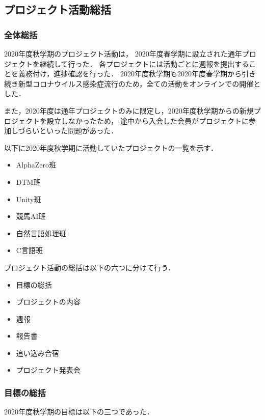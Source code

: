 \subsection*{プロジェクト活動総括}


\subsubsection*{全体総括}
2020年度秋学期のプロジェクト活動は，
2020年度春学期に設立された通年プロジェクトを継続して行った．
各プロジェクトには活動ごとに週報を提出することを義務付け，進捗確認を行った．
2020年度秋学期も2020年度春学期から引き続き新型コロナウイルス感染症流行のため，全ての活動をオンラインでの開催とした．

また，2020年度は通年プロジェクトのみに限定し，2020年度秋学期からの新規プロジェクトを設立しなかったため，
途中から入会した会員がプロジェクトに参加しづらいといった問題があった．

以下に2020年度秋学期に活動していたプロジェクトの一覧を示す．

\begin{itemize}
\item AlphaZero班
\item DTM班
\item Unity班
\item 競馬AI班
\item 自然言語処理班
\item C言語班
\end{itemize}

プロジェクト活動の総括は以下の六つに分けて行う．

\begin{itemize}
\item 目標の総括
\item プロジェクトの内容
\item 週報
\item 報告書
\item 追い込み合宿
\item プロジェクト発表会
\end{itemize}

\subsubsection*{目標の総括}
2020年度秋学期の目標は以下の三つであった．

